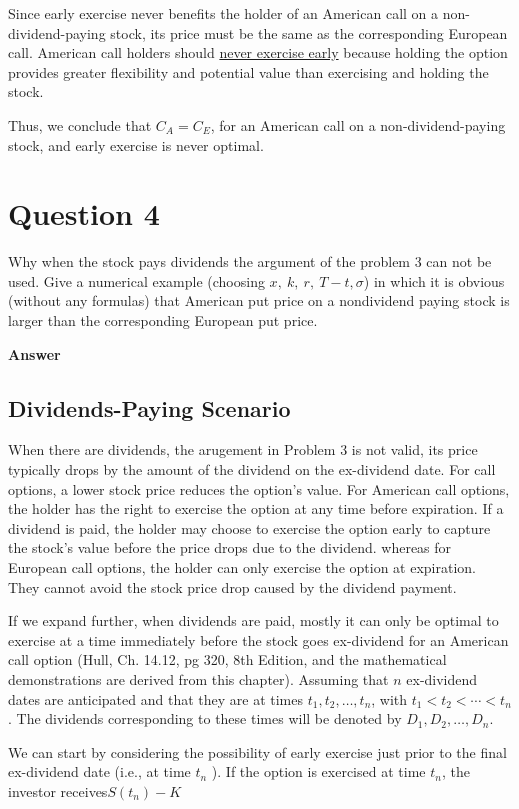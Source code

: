 \documentclass[letterpaper]{article}
\begin{document}
		Since early exercise never benefits the holder of an American call on a non-dividend-paying stock, its price must be the same as the corresponding European call. American call holders should \underline{never exercise early} because holding the option provides greater flexibility and potential value than exercising and holding the stock.
		
		Thus, we conclude that $C_A = C_E$, for an American call on a {non-dividend-paying stock}, and {early exercise is never optimal}.

		
		\pagebreak
		
		\section{Question 4}
		Why when the stock pays dividends the argument of the problem 3 can not be used. Give a numerical example (choosing ${x},\ {k},\ {r},\ {T}-{t}, \sigma$) in which it is obvious (without any formulas) that American put price on a nondividend paying stock is larger than the corresponding European put price.
		
		\textbf{Answer}
		\subsection{Dividends-Paying Scenario}
		When there are dividends, the arugement in Problem 3 is not valid,  its price typically drops by the amount of the dividend on the ex-dividend date. For call options, a lower stock price reduces the option's value. For American call options, the holder has the right to exercise the option at any time before expiration. If a dividend is paid, the holder may choose to exercise the option early to capture the stock's value before the price drops due to the dividend. whereas for European call options, the holder can only exercise the option at expiration. They cannot avoid the stock price drop caused by the dividend payment.
		
		 If we expand further, when dividends are paid, mostly it can only be optimal to exercise at a time immediately before the stock goes ex-dividend for an American call option (Hull, Ch. 14.12, pg 320, 8th Edition, and the mathematical demonstrations are derived from this chapter). Assuming that $n$ ex-dividend dates are anticipated and that they are at times $t_1, t_2, \ldots, t_n$, with $t_1<t_2<\cdots<t_n$. The dividends corresponding to these times will be denoted by $D_1, D_2, \ldots, D_n$.
		
		We can start by considering the possibility of early exercise just prior to the final ex-dividend date (i.e., at time $t_n$ ). If the option is exercised at time $t_n$, the investor receives$
		S\left(t_n\right)-K$
		
\end{document}
